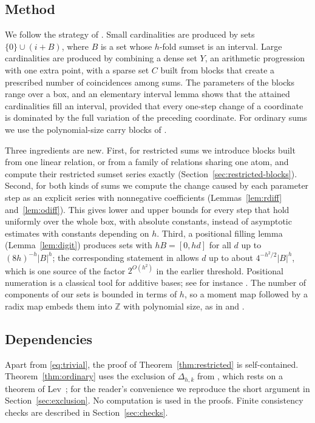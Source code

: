 \documentclass[11pt]{amsart}
\theoremstyle{definition}
\theoremstyle{remark}
\numberwithin{equation}{section}
\newcommand{\Z}{\mathbb{Z}}
\begin{document}
\subsection{Method}
We follow the strategy of \cite[Section~4]{Raj26}. Small cardinalities are produced by sets $\{0\}\cup(i+B)$, where $B$ is a set whose $h$-fold sumset is an interval. Large cardinalities are produced by combining a dense set $Y$, an arithmetic progression with one extra point, with a sparse set $C$ built from blocks that create a prescribed number of coincidences among sums. The parameters of the blocks range over a box, and an elementary interval lemma \cite[Lemma~4.5]{Raj26} shows that the attained cardinalities fill an interval, provided that every one-step change of a coordinate is dominated by the full variation of the preceding coordinate. For ordinary sums we use the polynomial-size carry blocks of \cite{PC}.

Three ingredients are new. First, for restricted sums we introduce blocks built from one linear relation, or from a family of relations sharing one atom, and compute their restricted sumset series exactly (Section~\ref{sec:restricted-blocks}). Second, for both kinds of sums we compute the change caused by each parameter step as an explicit series with nonnegative coefficients (Lemmas~\ref{lem:rdiff} and~\ref{lem:odiff}). This gives lower and upper bounds for every step that hold uniformly over the whole box, with absolute constants, instead of asymptotic estimates with constants depending on $h$. Third, a positional filling lemma (Lemma~\ref{lem:digit}) produces sets with $hB=[0,hd]$ for all $d$ up to $(8h)^{-h}|B|^h$; the corresponding statement in \cite[Lemma~4.4]{Raj26} allows $d$ up to about $4^{-h^2/2}|B|^h$, which is one source of the factor $2^{O(h^2)}$ in the earlier threshold. Positional numeration is a classical tool for additive bases; see for instance \cite{Tri08}. The number of components of our sets is bounded in terms of $h$, so a moment map followed by a radix map embeds them into $\Z$ with polynomial size, as in \cite{PC} and \cite[Lemma~4.6]{Raj26}.

\subsection*{Dependencies}
Apart from \eqref{eq:trivial}, the proof of Theorem~\ref{thm:restricted} is self-contained. Theorem~\ref{thm:ordinary} uses the exclusion of $\Delta_{h,k}$ from \cite[Theorem~1.3]{Raj26}, which rests on a theorem of Lev~\cite{Lev96}; for the reader's convenience we reproduce the short argument in Section~\ref{sec:exclusion}. No computation is used in the proofs. Finite consistency checks are described in Section~\ref{sec:checks}.
\end{document}

